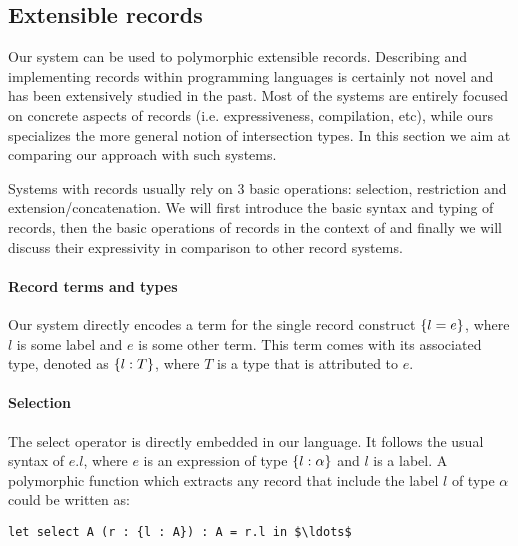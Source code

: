 \subsection{Extensible records}
Our system can be used to polymorphic extensible records. Describing and
implementing records within programming languages is certainly not
novel and has been extensively studied in the past. 
Most of the systems are entirely focused on concrete aspects of records
(i.e. expressiveness, compilation, etc), while ours specializes
the more general notion of intersection types.  In this section we aim
at comparing our approach with such systems.

Systems with records usually rely on 3 basic operations: selection,
restriction and extension/concatenation.  We will first introduce the
basic syntax and typing of records, then the basic operations of
records in the context of \name and finally we will discuss their
expressivity in comparison to other record systems.

\paragraph{Record terms and types}
Our system directly encodes a term for the single record construct $\{ l = e \}$, where $l$ is some
label and $e$ is some other term.
This term comes with its associated type, denoted as $\{ l : T \}$, where $T$ is a type that is attributed 
to $e$. 

\paragraph{Selection}
The select operator is directly embedded in our language. 
It follows the usual syntax of $e.l$, where $e$ is an expression of type $\{ l : \alpha \}$ and 
$l$ is a label.
A polymorphic function which extracts any record that include the label $l$ of type
$\alpha$ could be written as:

\begin{lstlisting}[mathescape=true]
let select A (r : {l : A}) : A = r.l in $\ldots$ 
\end{lstlisting}

